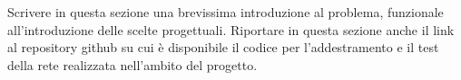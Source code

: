 Scrivere in questa sezione una brevissima introduzione al problema, funzionale
all’introduzione delle scelte progettuali. Riportare in questa sezione anche il link al repository github su cui è disponibile il codice per l’addestramento e il test della rete realizzata nell’ambito del progetto.